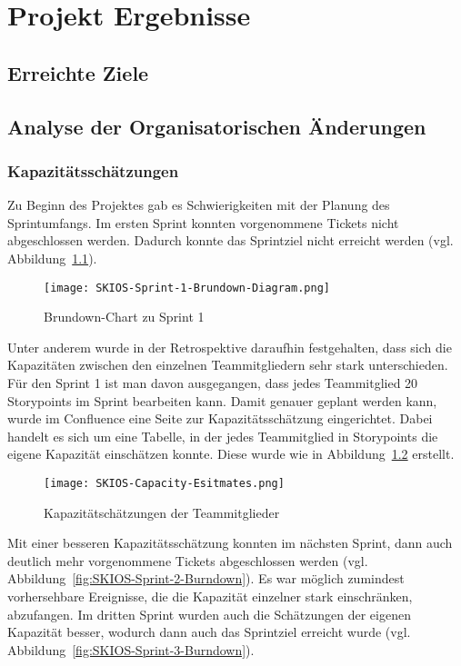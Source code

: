 
\chapter{Projekt Ergebnisse}

\section{Erreichte Ziele}

\section{Analyse der Organisatorischen Änderungen}

\subsection{Kapazitätsschätzungen}

Zu Beginn des Projektes gab es Schwierigkeiten mit der Planung des Sprintumfangs.
Im ersten Sprint konnten vorgenommene Tickets nicht abgeschlossen werden. 
Dadurch konnte das Sprintziel nicht erreicht werden (vgl. Abbildung~\ref{fig:SKIOS-Sprint-1-Brundown}).

\begin{figure}[h]
    \texttt{[image: SKIOS-Sprint-1-Brundown-Diagram.png]}
    \caption{Brundown-Chart zu Sprint 1}
    \label{fig:SKIOS-Sprint-1-Brundown}
\end{figure}

Unter anderem wurde in der Retrospektive daraufhin festgehalten, 
dass sich die Kapazitäten zwischen den einzelnen Teammitgliedern sehr stark unterschieden.
Für den Sprint 1 ist man davon ausgegangen, dass jedes Teammitglied 20 Storypoints im Sprint bearbeiten kann.
Damit genauer geplant werden kann, wurde im Confluence eine Seite zur Kapazitätsschätzung eingerichtet.
Dabei handelt es sich um eine Tabelle, in der jedes Teammitglied in Storypoints die eigene Kapazität einschätzen konnte.
Diese wurde wie in Abbildung~\ref{fig:Capacitytable} erstellt. 

\begin{figure}[h]
    \texttt{[image: SKIOS-Capacity-Esitmates.png]}
    \caption{Kapazitätschätzungen der Teammitglieder}
    \label{fig:Capacitytable}
\end{figure}

Mit einer besseren Kapazitätsschätzung konnten im nächsten Sprint, dann auch deutlich mehr vorgenommene Tickets abgeschlossen werden (vgl. Abbildung~\ref{fig:SKIOS-Sprint-2-Burndown}).
Es war möglich zumindest vorhersehbare Ereignisse, die die Kapazität einzelner stark einschränken, abzufangen.
Im dritten Sprint wurden auch die Schätzungen der eigenen Kapazität besser, wodurch dann auch das Sprintziel erreicht wurde (vgl. Abbildung~\ref{fig:SKIOS-Sprint-3-Burndown}).

